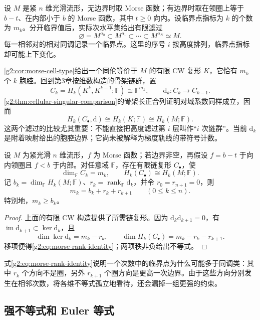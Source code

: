 设 \(M\) 是紧 \(n\) 维光滑流形，无边界时取 Morse 函数；有边界时取在领圈上等于 \(b-t\)、在内部小于 \(b\) 的 Morse 函数，其中 \(t\ge0\) 向内。设临界点指标为 \(k\) 的个数为 \(m_k\)。分开临界值后，实际次水平集给出有限滤过
\[
	\varnothing=M^{a_0}\subset M^{a_1}\subset\cdots\subset M^{a_N}\simeq M.
\]
每一相邻对的相对同调记录一个临界点。这里的序号 \(i\) 按高度排列，临界点指标却可能上下变化。

\ProseParagraphBreak

\cref{g2:cor:morse-cell-type}给出一个同伦等价于 \(M\) 的有限 CW 复形 \(K\)，它恰有 \(m_k\) 个 \(k\) 胞腔。回到第3章按维数构造的骨架链群，置
\[
	C_k=H_k(K^k,K^{k-1};\mathbb F)\cong\mathbb F^{m_k},\qquad
	\mathrm d_k:C_k\longrightarrow C_{k-1}.
\]
\cref{g2:thm:cellular-singular-comparison}的骨架长正合列证明对域系数同样成立，因而
\[
	H_k(C_\bullet,\mathrm d)\cong H_k(K;\mathbb F)\cong H_k(M;\mathbb F).
\]
这两个滤过的比较尤其重要：不能直接把高度滤过第 \(i\) 层叫作“\(i\) 次链群”。当前 \(\mathrm d_k\) 是附着映射给出的胞腔边界；它尚未被解释为梯度轨线的带符号计数。

\begin{proposition}\label{g2:prop:morse-chain-ranks}
	设 \(M\) 为紧光滑 \(n\) 维流形，\(f\) 为 Morse 函数；若边界非空，再假设 \(f=b-t\) 于向内领圈且 \(f<b\) 于内部。对任意域 \(\mathbb F\)，存在有限链复形 \(C_\bullet\)，使
	\[
		\dim_{\mathbb F}C_k=m_k,\qquad H_k(C_\bullet)\cong H_k(M;\mathbb F).
	\]
	记 \(b_k=\dim_{\mathbb F}H_k(M;\mathbb F)\)、\(r_k=\operatorname{rank}_{\mathbb F}\mathrm d_k\)，并令 \(r_0=r_{n+1}=0\)，则
	\begin{equation}\label{g2:eq:morse-rank-identity}
		m_k=b_k+r_k+r_{k+1}\qquad(0\le k\le n).
	\end{equation}
	特别地，\(m_k\ge b_k\)。
\end{proposition}
\begin{proof}
	上面的有限 CW 构造提供了所需链复形。因为 \(\mathrm d_k\mathrm d_{k+1}=0\)，有 \(\operatorname{im}\mathrm d_{k+1}\subset\ker\mathrm d_k\)，且
	\[
		\dim\ker\mathrm d_k=m_k-r_k,\qquad
		\dim H_k(C_\bullet)=m_k-r_k-r_{k+1}.
	\]
	移项便得\eqref{g2:eq:morse-rank-identity}；两项秩非负给出不等式。
\end{proof}

式\eqref{g2:eq:morse-rank-identity}说明一个次数中的临界点为什么可能多于同调类：其中 \(r_k\) 个方向不是圈，另外 \(r_{k+1}\) 个圈方向是更高一次边界。由于这些方向分别发生在相邻次数，将各维不等式孤立地看待，还会漏掉一组更强的约束。

\subsection{强不等式和 Euler 等式}
\label{g2:subsec:1703:03}

